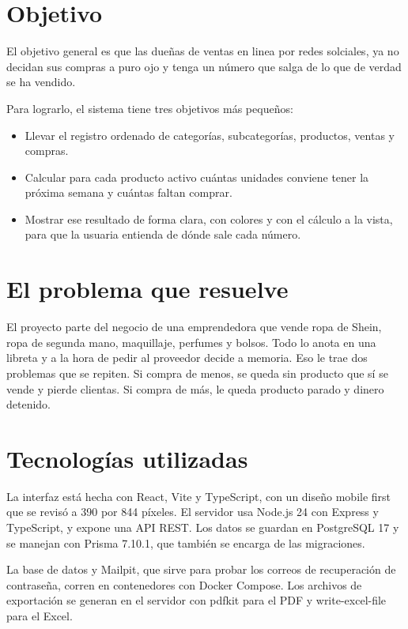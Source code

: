 \documentclass[12pt,letterpaper]{article}
\begin{document}
\section{Objetivo}

El objetivo general es que las dueñas de ventas en linea por redes solciales, ya no decidan sus compras a puro ojo y tenga un número que salga de lo que de verdad se ha vendido.

Para lograrlo, el sistema tiene tres objetivos más pequeños:

\begin{itemize}
\item Llevar el registro ordenado de categorías, subcategorías, productos, ventas y compras.
\item Calcular para cada producto activo cuántas unidades conviene tener la próxima semana y cuántas faltan comprar.
\item Mostrar ese resultado de forma clara, con colores y con el cálculo a la vista, para que la usuaria entienda de dónde sale cada número.
\end{itemize}

\section{El problema que resuelve}

El proyecto parte del negocio de una emprendedora que vende ropa de Shein, ropa de segunda mano, maquillaje, perfumes y bolsos. Todo lo anota en una libreta y a la hora de pedir al proveedor decide a memoria. Eso le trae dos problemas que se repiten. Si compra de menos, se queda sin producto que sí se vende y pierde clientas. Si compra de más, le queda producto parado y dinero detenido.

\section{Tecnologías utilizadas}

La interfaz está hecha con React, Vite y TypeScript, con un diseño mobile first que se revisó a 390 por 844 píxeles. El servidor usa Node.js 24 con Express y TypeScript, y expone una API REST. Los datos se guardan en PostgreSQL 17 y se manejan con Prisma 7.10.1, que también se encarga de las migraciones.

La base de datos y Mailpit, que sirve para probar los correos de recuperación de contraseña, corren en contenedores con Docker Compose. Los archivos de exportación se generan en el servidor con pdfkit para el PDF y write-excel-file para el Excel.
\end{document}
